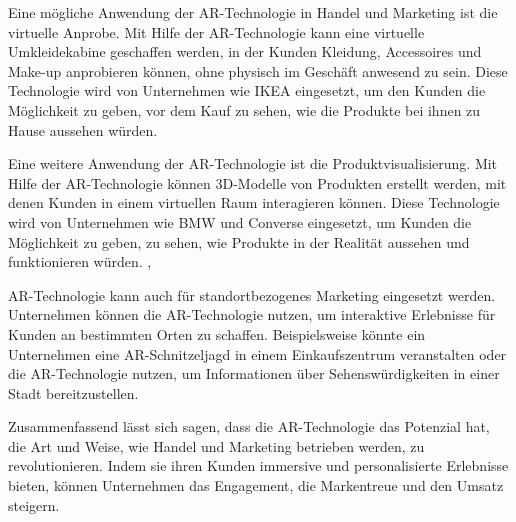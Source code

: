 Eine mögliche Anwendung der AR-Technologie in Handel und Marketing ist die virtuelle Anprobe. Mit Hilfe der AR-Technologie kann eine virtuelle Umkleidekabine geschaffen werden, in der Kunden Kleidung, Accessoires und Make-up anprobieren können, ohne physisch im Geschäft anwesend zu sein. Diese Technologie wird von Unternehmen wie IKEA eingesetzt, um den Kunden die Möglichkeit zu geben, vor dem Kauf zu sehen, wie die Produkte bei ihnen zu Hause aussehen würden. \cite{IKEA_2017}

Eine weitere Anwendung der AR-Technologie ist die Produktvisualisierung. Mit Hilfe der AR-Technologie können 3D-Modelle von Produkten erstellt werden, mit denen Kunden in einem virtuellen Raum interagieren können. Diese Technologie wird von Unternehmen wie BMW und Converse eingesetzt, um Kunden die Möglichkeit zu geben, zu sehen, wie Produkte in der Realität aussehen und funktionieren würden. \cite{Boeriu_2022}, \cite{Online_Campaigns_2012}

AR-Technologie kann auch für standortbezogenes Marketing eingesetzt werden. Unternehmen können die AR-Technologie nutzen, um interaktive Erlebnisse für Kunden an bestimmten Orten zu schaffen. Beispielsweise könnte ein Unternehmen eine AR-Schnitzeljagd in einem Einkaufszentrum veranstalten oder die AR-Technologie nutzen, um Informationen über Sehenswürdigkeiten in einer Stadt bereitzustellen.

Zusammenfassend lässt sich sagen, dass die AR-Technologie das Potenzial hat, die Art und Weise, wie Handel und Marketing betrieben werden, zu revolutionieren. Indem sie ihren Kunden immersive und personalisierte Erlebnisse bieten, können Unternehmen das Engagement, die Markentreue und den Umsatz steigern.



